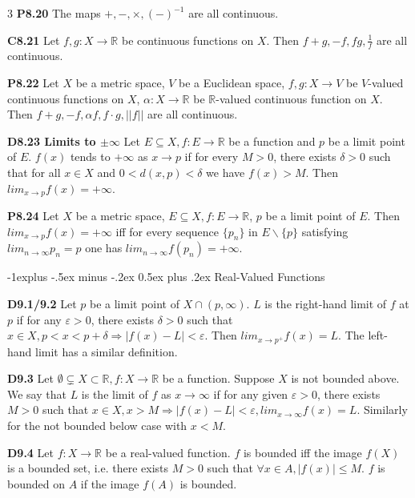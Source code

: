 \documentclass[10pt, landscape]{article}
\makeatletter
\renewcommand{\section}{\@startsection{section}{1}{0mm}%
                                {-1ex plus -.5ex minus -.2ex}%
                                {0.5ex plus .2ex}%
                                {\normalfont\large\bfseries}}
\renewcommand{\section}{\@startsection{section}{2}{0mm}%
                                {-1explus -.5ex minus -.2ex}%
                                {0.5ex plus .2ex}%
                                {\normalfont\normalsize\bfseries}}
\makeatother
\begin{document}
\begin{multicols*}{3}
\textbf{P8.20} The maps $+,-,\times, (-)^{-1}$ are all continuous.

\textbf{C8.21} Let $f,g:X\rightarrow \mathbb{R}$ be continuous functions on $X$. Then $f+g, -f, fg, \frac{1}{f}$ are all continuous.

\textbf{P8.22} Let $X$ be a metric space, $V$ be a Euclidean space, $f, g: X \rightarrow V$ be $V$-valued continuous functions on $X$, $\alpha : X \rightarrow \mathbb{R}$ be $\mathbb{R}$-valued continuous function on $X$. Then $f+g, -f, \alpha f, f\cdot g, ||f||$ are all continuous.

\textbf{D8.23 Limits to $\pm \infty$} Let $E \subseteq X, f:E \rightarrow \mathbb{R}$ be a function and $p$ be a limit point of $E$. $f(x)$ tends to $+\infty$ as $x\rightarrow p$ if for every $M>0$, there exists $\delta > 0$ such that for all $x \in X$ and $0<d(x,p)< \delta$ we have $f(x) > M$. Then $lim_{x\rightarrow p}f(x) = +\infty$.

\textbf{P8.24} Let $X$ be a metric space, $E \subseteq X, f: E \rightarrow \mathbb{R}$, $p$ be a limit point of $E$. Then $lim_{x \rightarrow p}f(x)=+\infty$ iff for every sequence $\{p_n\}$ in $E\backslash\{p\}$ satisfying $lim_{n\rightarrow\infty}p_n=p$ one has $lim_{n\rightarrow\infty}f(p_n)=+\infty$.

\section{Real-Valued Functions}

\textbf{D9.1/9.2} Let $p$ be a limit point of $X \cap (p, \infty)$. $L$ is the right-hand limit of $f$ at $p$ if for any $\varepsilon>0$, there exists $\delta > 0$ such that $x \in X, p<x<p+\delta \Rightarrow |f(x)-L|<\varepsilon$. Then $lim_{x\rightarrow p^+}f(x)=L$. The left-hand limit has a similar definition.

\textbf{D9.3} Let $\emptyset \subsetneq X \subset \mathbb{R}, f:X\rightarrow \mathbb{R}$ be a function. Suppose $X$ is not bounded above. We say that $L$ is the limit of $f$ as $x\rightarrow \infty$ if for any given $\varepsilon > 0$, there exists $M>0$ such that $x \in X, x>M \Rightarrow |f(x)-L| < \varepsilon, lim_{x \rightarrow\infty}f(x)=L$. Similarly for the not bounded below case with $x < M$.

\textbf{D9.4} Let $f:X \rightarrow \mathbb{R}$ be a real-valued function. $f$ is bounded iff the image $f(X)$ is a bounded set, i.e. there exists $M>0$ such that $\forall x \in A, |f(x)| \leq M$. $f$ is bounded on $A$ if the image $f(A)$ is bounded.


\end{multicols*}
\end{document}
